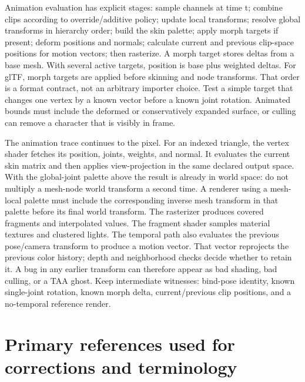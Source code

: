 Animation evaluation has explicit stages: sample channels at time t; combine clips according to override/additive policy; update local transforms; resolve global transforms in hierarchy order; build the skin palette; apply morph targets if present; deform positions and normals; calculate current and previous clip-space positions for motion vectors; then rasterize. A morph target stores deltas from a base mesh. With several active targets, position is base plus weighted deltas. For glTF, morph targets are applied before skinning and node transforms. That order is a format contract, not an arbitrary importer choice. Test a simple target that changes one vertex by a known vector before a known joint rotation. Animated bounds must include the deformed or conservatively expanded surface, or culling can remove a character that is visibly in frame.

The animation trace continues to the pixel. For an indexed triangle, the vertex shader fetches its position, joints, weights, and normal. It evaluates the current skin matrix and then applies view-projection in the same declared output space. With the global-joint palette above the result is already in world space: do not multiply a mesh-node world transform a second time. A renderer using a mesh-local palette must include the corresponding inverse mesh transform in that palette before its final world transform. The rasterizer produces covered fragments and interpolated values. The fragment shader samples material textures and clustered lights. The temporal path also evaluates the previous pose/camera transform to produce a motion vector. That vector reprojects the previous color history; depth and neighborhood checks decide whether to retain it. A bug in any earlier transform can therefore appear as bad shading, bad culling, or a TAA ghost. Keep intermediate witnesses: bind-pose identity, known single-joint rotation, known morph delta, current/previous clip positions, and a no-temporal reference render.

\section{Primary references used for corrections and terminology}\label{04-visual-computing-ii-ch037-primary-references-used-for-corrections-and-terminology}


